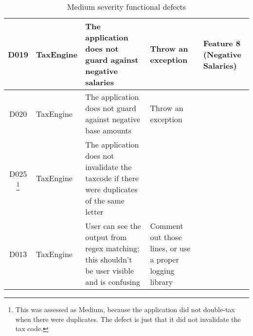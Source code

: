 \begin{table}[H]
\begin{minipage}{\textwidth}
\begin{tabularx}{\textwidth}{| c | P | X | X | P |}
D019 
& TaxEngine 
& The application does not guard against negative salaries 
& Throw an exception  
& Feature 8 (Negative Salaries)\\
\hline %
D020 
& TaxEngine 
& The application does not guard against negative base amounts 
& Throw an exception  
& \\
\hline %
D025 \footnote{This was assessed as Medium, because the application did not double-tax when there were duplicates. The defect is just that it did not invalidate the tax code.}
& TaxEngine 
& The application does not invalidate the taxcode if there were duplicates of the same letter  
&  
& \\
\hline %
D013 
& TaxEngine 
& User can see the output from regex matching; this shouldn't be user visible and is confusing  
& Comment out those lines, or use a proper logging library  
& \\
\hline %
\end{tabularx}
\caption{Medium severity functional defects}
\end{minipage}
\end{table}